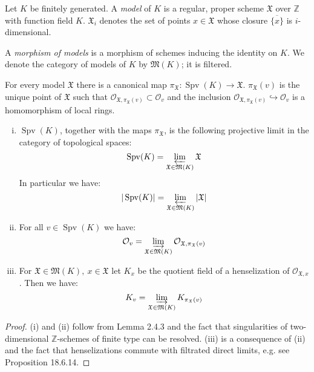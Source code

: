 \begin{definition}
Let $K$ be finitely generated. A \textit{model} of $K$ is a regular, proper scheme $\mathfrak{X}$ over $\mathbb{Z}$ with function field $K$. $\mathfrak{X}_i$ denotes the set of points $x\in\mathfrak{X}$ whose closure $\overline{\{x\}}$ is $i$-dimensional.

A \textit{morphism of models} is a morphism of schemes inducing the identity on $K$. We denote the category of models of $K$ by $\mathfrak{M}(K)$; it is filtered. 

For every model $\mathfrak{X}$ there is a canonical map $\pi_\mathfrak{X}:\operatorname{Spv}(K)\to\mathfrak{X}$. $\pi_\mathfrak{X}(v)$  is the unique point of $\mathfrak{X}$ such that $\mathcal{O}_{\mathfrak{X}, \pi_\mathfrak{X}(v)}\subset\mathcal{O}_v$ and the inclusion $\mathcal{O}_{\mathfrak{X}, \pi_\mathfrak{X}(v)}\hookrightarrow \mathcal{O}_v$ is a homomorphism of local rings.
\end{definition}

\begin{lemma}\label{2.3}
\begin{enumerate}[(i)]
\item $\operatorname{Spv}(K)$, together with the maps $\pi_{\mathfrak{X}}$, is the following projective limit in the category of topological spaces: 
\[\operatorname{Spv}(K) =\varprojlim_{\mathfrak{X}\in\mathfrak{M}(K)}\mathfrak{X}\]
In particular we have:
\[ |\operatorname{Spv}(K)| =\varprojlim_{\mathfrak{X}\in\mathfrak{M}(K)}|\mathfrak{X}| \]
\item For all $v\in\operatorname{Spv}(K)$ we have:
\[ \mathcal{O}_v = \varinjlim_{\mathfrak{X}\in\mathfrak{M}(K)}\mathcal{O}_{\mathfrak{X},\pi_\mathfrak{X}(v)} \]
\item For $\mathfrak{X}\in\mathfrak{M}(K),\ x\in\mathfrak{X}$ let $K_x$ be the quotient field of a henselization of $\mathcal{O}_{\mathfrak{X},x}$. Then we have:
\[ K_v=\varinjlim_{\mathfrak{X}\in\mathfrak{M}(K)}K_{\pi_\mathfrak{X}(v)} \]
\end{enumerate}
\end{lemma}

\begin{proof}
(i) and (ii) follow from \cite{HK94} Lemma 2.4.3 and the fact that singularities of two-dimensional $\mathbb{Z}$-schemes of finite type can be resolved. (iii) is a consequence of (ii) and the fact that henselizations commute with filtrated direct limits, e.g. see \cite{EGA4} Proposition 18.6.14.
\end{proof}

